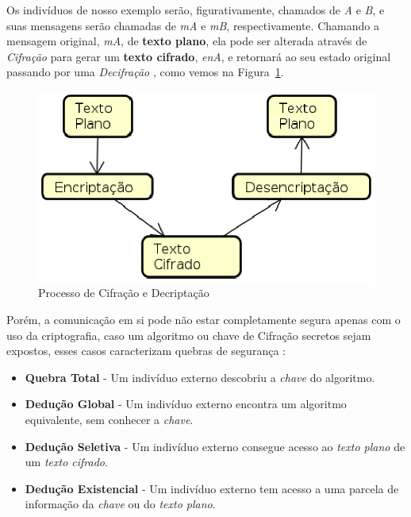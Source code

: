 	Os indivíduos de nosso exemplo serão, figurativamente, chamados de \textit{A} e \textit{B}, e suas mensagens serão chamadas de \textit{mA} e \textit{mB}, respectivamente. Chamando a mensagem original, \textit{mA}, de \textbf{texto plano}, ela pode ser alterada através de \textit{Cifração} para gerar um \textbf{texto cifrado}, \textit{enA}, e retornará ao seu estado original passando por uma \textit{Decifração} \cite[p.~15]{schneier96}, como vemos na Figura~\ref{fig:img01}.

	\begin{figure}[h]
		\centering
		\includegraphics[keepaspectratio=true,scale=0.5]{figuras/proc.eps}
		\caption{Processo de Cifração e Decriptação}
		\label{fig:img01}
	\end{figure}

	Porém, a comunicação em si pode não estar completamente segura apenas com o uso da criptografia, caso um algoritmo ou chave de Cifração secretos sejam expostos, esses casos caracterizam quebras de segurança \cite[p.~399]{stallings11}:
	
	\begin{itemize}
		\item \textbf{Quebra Total} - Um indivíduo externo descobriu a \textit{chave} do algoritmo.
		\item \textbf{Dedução Global} - Um indivíduo externo encontra um algoritmo equivalente, sem conhecer a \textit{chave}.
		\item \textbf{Dedução Seletiva} - Um indivíduo externo consegue acesso ao \textit{texto plano} de um \textit{texto cifrado}.
		\item \textbf{Dedução Existencial} - Um indivíduo externo tem acesso a uma parcela de informação da \textit{chave} ou do \textit{texto plano}. 
	\end{itemize}

